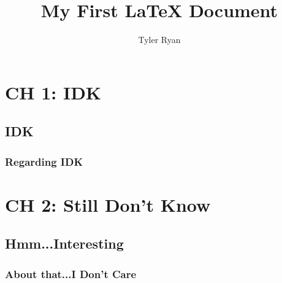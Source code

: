 \documentclass{report}
\author{Tyler Ryan}
\title{My First {\LaTeX} Document}
\begin{document}
\maketitle
\tableofcontents

\chapter{CH 1: IDK}
\section{IDK}
\subsection{Regarding IDK}
\chapter{CH 2: Still Don't Know}
\section{Hmm...Interesting}
\subsection{About that...I Don't Care}
\end{document}
